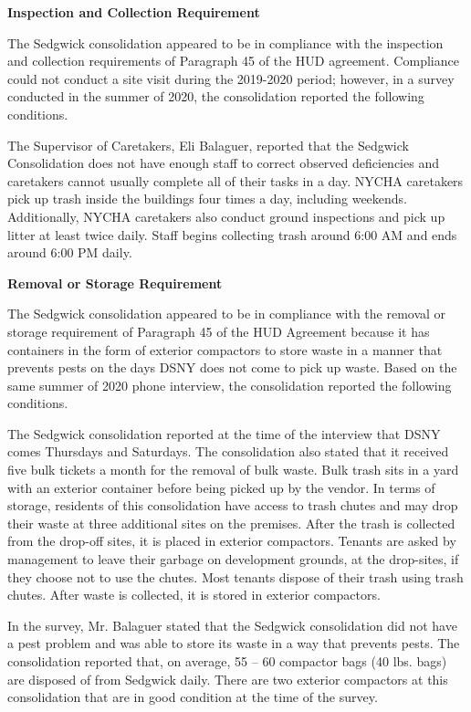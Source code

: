  

\textbf{Inspection and Collection Requirement} 

 

The Sedgwick consolidation appeared to be in compliance with the inspection and collection requirements of Paragraph 45 of the HUD agreement. Compliance could not conduct a site visit during the 2019-2020 period; however, in a survey conducted in the summer of 2020, the consolidation reported the following conditions.

The Supervisor of Caretakers, Eli Balaguer, reported that the Sedgwick Consolidation does not have enough staff to correct observed deficiencies and caretakers cannot usually complete all of their tasks in a day. NYCHA caretakers pick up trash inside the buildings four times a day, including weekends. Additionally, NYCHA caretakers also conduct ground inspections and pick up litter at least twice daily. Staff begins collecting trash around 6:00 AM and ends around 6:00 PM daily. 

 

\textbf{Removal or Storage Requirement} 

The Sedgwick consolidation appeared to be in compliance with the removal or storage requirement of Paragraph  45 of the HUD Agreement because it has containers in the form of exterior compactors to store waste in a manner that prevents pests on the days DSNY does not come to pick up waste. Based on the same summer of  2020 phone interview, the consolidation reported the following conditions.

  

The Sedgwick consolidation reported at the time of the interview that DSNY comes Thursdays and Saturdays. The consolidation also stated that it received five bulk tickets a month for the removal of bulk waste. Bulk trash sits in a yard with an exterior container before being picked up by the vendor.  In terms of storage, residents of this consolidation have access to trash chutes and may drop their waste at three additional sites on the premises. After the trash is collected from the drop-off sites, it is placed in exterior compactors. Tenants are asked by management to leave their garbage on development grounds, at the drop-sites, if they choose not to use the chutes. Most tenants dispose of their trash using trash chutes. After waste is collected, it is stored in exterior compactors.

 

In the survey, Mr. Balaguer stated that the Sedgwick consolidation did not have a pest problem and was able to store its waste in a way that prevents pests. The consolidation reported that, on average, 55 -- 60 compactor bags (40 lbs. bags) are disposed of from Sedgwick daily. There are two exterior compactors at this consolidation that are in good condition at the time of the survey.

